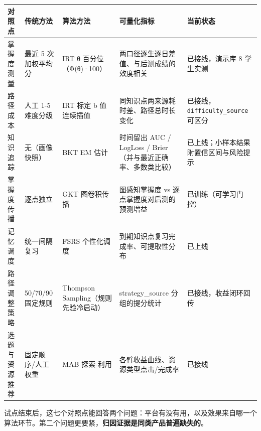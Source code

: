 \documentclass[zihao=-4,a4paper,UTF8,fontset=windows]{ctexart}
\begin{document}
\par\noindent\begin{tabular}{|p{2.0cm}|p{2.0cm}|p{2.4cm}|p{3.3cm}|p{3.2cm}|}
\hline
\textbf{对照点} & \textbf{传统方法} & \textbf{算法方法} & \textbf{可量化指标} & \textbf{当前状态} \\ \hline
掌握度测量 & 最近 5 次加权平均分 & IRT θ 百分位（Φ(θ)·100） & 两口径逐生逐日差值、与后测成绩的效度相关 & 已接线，演示库 8 学生实测 \\ \hline
路径成本 & 人工 1-5 难度分级 & IRT 标定 b 值连续插值 & 同知识点两来源耗时差、路径总时长变化 & 已接线，\texttt{difficulty\_\allowbreak{}source} 可区分 \\ \hline
知识追踪 & 无（画像快照） & BKT EM 估计 & 时间留出 AUC / LogLoss / Brier（并与最近正确率、多数类比较） & 已上线；小样本结果附置信区间与风险提示 \\ \hline
掌握度传播 & 逐点独立 & GKT 图卷积传播 & 图感知掌握度 vs 逐点掌握度对后测的预测增益 & 已训练（可学习门控） \\ \hline
记忆调度 & 统一间隔复习 & FSRS 个性化调度 & 到期知识点复习完成率、可提取性分布 & 已上线 \\ \hline
路径调整策略 & 50/70/90 固定规则 & Thompson Sampling（规则先验冷启动） & strategy\_source 分组的提分统计 & 已接线，收益闭环回传 \\ \hline
选题与资源推荐 & 固定顺序/人工权重 & MAB 探索-利用 & 各臂收益曲线、资源类型点击/完成率 & 已接线 \\ \hline
\end{tabular}\par


试点结束后，这七个对照点能回答两个问题：平台有没有用，以及效果来自哪一个算法环节。第二个问题更要紧，\textbf{归因证据是同类产品普遍缺失的}。
\end{document}
